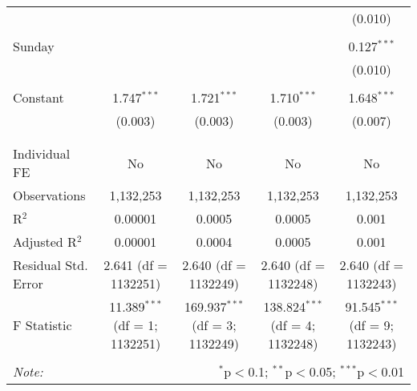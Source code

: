 \documentclass[
]{article}
\begin{document}
\begin{table}[!htbp]
{\begin{tabular}{@{\extracolsep{5pt}}lcccc}
  &  &  &  & (0.010) \\ 
  & & & & \\ 
 Sunday &  &  &  & 0.127$^{***}$ \\ 
  &  &  &  & (0.010) \\ 
  & & & & \\ 
 Constant & 1.747$^{***}$ & 1.721$^{***}$ & 1.710$^{***}$ & 1.648$^{***}$ \\ 
  & (0.003) & (0.003) & (0.003) & (0.007) \\ 
  & & & & \\ 
\hline \\[-1.8ex] 
Individual FE & No & No & No & No \\ 
Observations & 1,132,253 & 1,132,253 & 1,132,253 & 1,132,253 \\ 
R$^{2}$ & 0.00001 & 0.0005 & 0.0005 & 0.001 \\ 
Adjusted R$^{2}$ & 0.00001 & 0.0004 & 0.0005 & 0.001 \\ 
Residual Std. Error & 2.641 (df = 1132251) & 2.640 (df = 1132249) & 2.640 (df = 1132248) & 2.640 (df = 1132243) \\ 
F Statistic & 11.389$^{***}$ (df = 1; 1132251) & 169.937$^{***}$ (df = 3; 1132249) & 138.824$^{***}$ (df = 4; 1132248) & 91.545$^{***}$ (df = 9; 1132243) \\ 
\hline 
\hline \\[-1.8ex] 
\textit{Note:}  & \multicolumn{4}{r}{$^{*}$p$<$0.1; $^{**}$p$<$0.05; $^{***}$p$<$0.01} \\ 
\end{tabular}
} 
\end{table} 
\newpage
\end{document}
